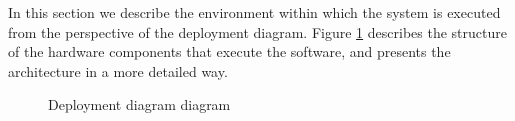 
In this section we describe the environment within which the system is executed from the perspective of the deployment diagram. Figure \ref{fig:deployment_diagram} describes the structure of the hardware components that execute the software, and presents the architecture in a more detailed way.


\begin{figure}[H]
    \caption{\label{fig:deployment_diagram}Deployment diagram diagram}
\end{figure}

